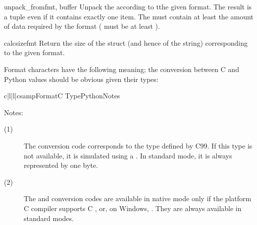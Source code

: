 \begin{funcdesc}{unpack_from}{fmt, buffer}
  Unpack the  according to tthe given format.
  The result is a tuple even if it contains exactly one item. The
   must contain at least the amount of data required by the
  format ( must be at least
  ).

\end{funcdesc}

\begin{funcdesc}{calcsize}{fmt}
  Return the size of the struct (and hence of the string)
  corresponding to the given format.
\end{funcdesc}

Format characters have the following meaning; the conversion between
C and Python values should be obvious given their types:

\begin{tableiv}{c|l|l|c}{samp}{Format}{C Type}{Python}{Notes}
\end{tableiv}

\noindent
Notes:

\begin{description}
\item[(1)]
  The  conversion code corresponds to the  type
  defined by C99. If this type is not available, it is simulated using a
  . In standard mode, it is always represented by one byte.
\item[(2)]
  The  and  conversion codes are available in
  native mode only if the platform C compiler supports C ,
  or, on Windows, .  They are always available in standard
  modes.
\end{description}


